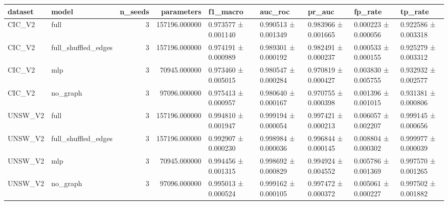 \begin{tabular}{llrrlllll}
\toprule
dataset & model & n_seeds & parameters & f1_macro & auc_roc & pr_auc & fp_rate & tp_rate \\
\midrule
CIC_V2 & full & 3 & 157196.000000 & 0.973577 ± 0.001140 & 0.990513 ± 0.001349 & 0.983966 ± 0.001665 & 0.000223 ± 0.000056 & 0.922586 ± 0.003318 \\
CIC_V2 & full_shuffled_edges & 3 & 157196.000000 & 0.974191 ± 0.000989 & 0.989301 ± 0.000192 & 0.982491 ± 0.000237 & 0.000533 ± 0.000155 & 0.925279 ± 0.003312 \\
CIC_V2 & mlp & 3 & 70945.000000 & 0.973460 ± 0.005015 & 0.980547 ± 0.000284 & 0.970819 ± 0.000427 & 0.003830 ± 0.005755 & 0.932932 ± 0.002577 \\
CIC_V2 & no_graph & 3 & 97096.000000 & 0.975413 ± 0.000957 & 0.980640 ± 0.000167 & 0.970755 ± 0.000398 & 0.001396 ± 0.001015 & 0.931381 ± 0.000806 \\
UNSW_V2 & full & 3 & 157196.000000 & 0.994810 ± 0.001947 & 0.999194 ± 0.000054 & 0.997421 ± 0.000213 & 0.006057 ± 0.002207 & 0.999145 ± 0.000656 \\
UNSW_V2 & full_shuffled_edges & 3 & 157196.000000 & 0.992907 ± 0.000230 & 0.998984 ± 0.000036 & 0.996844 ± 0.000145 & 0.008804 ± 0.000302 & 0.999977 ± 0.000039 \\
UNSW_V2 & mlp & 3 & 70945.000000 & 0.994456 ± 0.001315 & 0.998692 ± 0.000829 & 0.994924 ± 0.004552 & 0.005786 ± 0.001369 & 0.997570 ± 0.001265 \\
UNSW_V2 & no_graph & 3 & 97096.000000 & 0.995013 ± 0.000524 & 0.999162 ± 0.000105 & 0.997472 ± 0.000372 & 0.005061 ± 0.000227 & 0.997502 ± 0.001882 \\
\bottomrule
\end{tabular}

